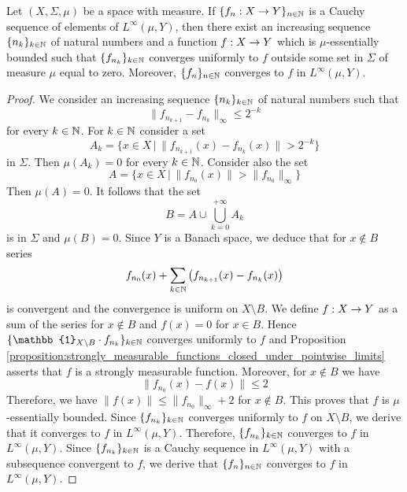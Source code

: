\begin{theorem}[Riesz]\label{theorem:Riesz_theorem_for_L_infinity}
Let $(X,\Sigma,\mu)$ be a space with measure. If $\{f_n:X\rightarrow Y\}_{n\in {\mathbb N}}$ is a Cauchy sequence of elements of $L^{\infty}(\mu,Y)$, then there exist an increasing sequence $\{n_k\}_{k\in {\mathbb N}}$ of natural numbers and a function $f:X\rightarrow Y$ which is $\mu$-essentially bounded such that $\{f_{n_k}\}_{k \in {\mathbb N}}$ converges uniformly to $f$ outside some set in $\Sigma$ of measure $\mu$ equal to zero. Moreover, $\{f_n\}_{n\in {\mathbb N}}$ converges to $f$ in $L^{\infty}(\mu,Y)$.
\end{theorem}
\begin{proof}
We consider an increasing sequence $\{n_k\}_{k\in {\mathbb N}}$ of natural numbers such that
$$\lVert f_{n_{k+1}} - f_{n_k}\rVert_{\infty} \leq 2^{-k}$$
for every $k\in {\mathbb N}$. For $k\in {\mathbb N}$ consider a set
$$A_k = \big\{x\in X\,\big|\,\lVert f_{n_{k+1}}(x) - f_{n_k}(x) \rVert > 2^{-k} \big\}$$
in $\Sigma$. Then $\mu(A_k) = 0$ for every $k \in {\mathbb N}$. Consider also the set
$$A = \big\{x\in X\,\big|\,\lVert f_{n_{0}}(x) \rVert > \lVert f_{n_0}\rVert_{\infty} \big\}$$
Then $\mu(A) = 0$. It follows that the set 
$$B = A \cup \bigcup_{k=0}^{+\infty}A_k$$
is in $\Sigma$ and $\mu(B) = 0$. Since $Y$ is a Banach space, we deduce that for $x\not \in B$ series
$$f_{n_0}(x) + \sum_{k\in {\mathbb N}}\left(f_{n_{k+1}}(x) - f_{n_k}(x)\right)$$
is convergent and the convergence is uniform on $X\setminus B$. We define $f:X\rightarrow Y$ as a sum of the series for $x\not \in B$ and $f(x) = 0$ for $x\in B$. Hence $\{\mathbb{1}_{X\setminus B}\cdot f_{n_k}\}_{k\in \NN}$ converges uniformly to $f$ and Proposition \ref{proposition:strongly_measurable_functions_closed_under_pointwise_limits} asserts that $f$ is a strongly measurable function. Moreover, for $x\not \in B$ we have
$$\lVert f_{n_0}(x) - f(x)\rVert \leq 2$$
Therefore, we have $\lVert f(x) \rVert \leq \lVert f_{n_0}\rVert_{\infty} + 2$ for $x\not \in B$. This proves that $f$ is $\mu$-essentially bounded. Since $\{f_{n_k}\}_{k\in {\mathbb N}}$ converges uniformly to $f$ on $X\setminus B$, we derive that it converges to $f$ in $L^{\infty}(\mu,Y)$. Therefore, $\{f_{n_k}\}_{k\in {\mathbb N}}$ converges to $f$ in $L^{\infty}(\mu,Y)$. Since $\{f_{n_k}\}_{k\in {\mathbb N}}$ is a Cauchy sequence in $L^{\infty}(\mu,Y)$ with a subsequence convergent to $f$, we derive that $\{f_n\}_{n\in {\mathbb N}}$ converges to $f$ in $L^{\infty}(\mu,Y)$.
\end{proof}














\small



